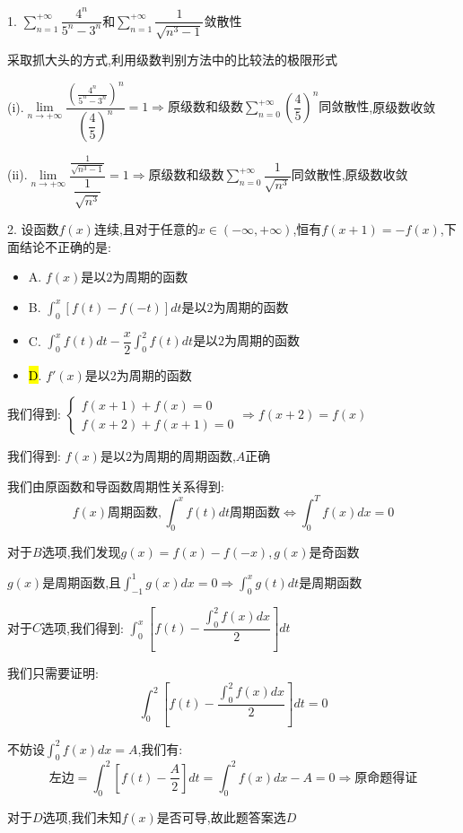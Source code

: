 1. $\sum\limits_{n=1}^{+\infty}\dfrac{4^n}{5^n-3^n}$和$\sum\limits_{n=1}^{+\infty}\dfrac{1}{\sqrt{n^3-1}}$敛散性
\begin{solution}
	
	采取抓大头的方式,利用级数判别方法中的比较法的极限形式
	
	(i).$\lim\limits_{n\rightarrow+\infty}\dfrac{(\frac{4^n}{5^n-3^n})^n}{(\dfrac{4}{5})^n}=1\Rightarrow \text{原级数和级数}\sum\limits_{n=0}^{+\infty}(\dfrac{4}{5})^n\text{同敛散性}$,原级数收敛
	
	(ii).$\lim\limits_{n\rightarrow+\infty}\dfrac{\frac{1}{\sqrt{n^3-1}}}{\dfrac{1}{\sqrt{n^3}}}=1\Rightarrow \text{原级数和级数}\sum\limits_{n=0}^{+\infty}\dfrac{1}{\sqrt{n^3}}\text{同敛散性}$,原级数收敛
\end{solution}


2. 设函数$f(x)$连续,且对于任意的$x\in(-\infty,+\infty)$,恒有$f(x+1)=-f(x)$,下面结论不正确的是: 
\begin{itemize}
	\item A. $f(x)\text{是以2为周期的函数}$ 
	\item B. $\int_{0}^{x}[f(t)-f(-t)]dt\text{是以2为周期的函数}$ 
	\item C. $\int_{0}^{x}f(t)dt-\dfrac{x}{2}\int_{0}^{2}f(t)dt\text{是以2为周期的函数}$ 
	\item \hl{D}. $f'(x)\text{是以2为周期的函数}$ 
\end{itemize}
\begin{solution}
	
	我们得到: $\left\lbrace 
	\begin{array}{l}
		f(x+1)+f(x)=0\\
		f(x+2)+f(x+1)=0
	\end{array}
	\right. \Rightarrow f(x+2)=f(x)$
	
	我们得到: $f(x)$是以$2$为周期的周期函数,$A$正确
	
	我们由原函数和导函数周期性关系得到: 
	$$f(x)\text{周期函数},\int_{0}^{x}f(t)dt\text{周期函数}\Leftrightarrow \int_{0}^{T}f(x)dx=0$$
	
	对于$B$选项,我们发现$g(x)=f(x)-f(-x),g(x)\text{是奇函数}$
	
	$g(x)\text{是周期函数}$,且$\int_{-1}^{1}g(x)dx=0\Rightarrow \int_{0}^{x}g(t)dt\text{是周期函数}$
	
	对于$C$选项,我们得到: $\int_{0}^{x}[f(t)-\dfrac{\int_{0}^{2}f(x)dx}{2}]dt$
	
	我们只需要证明: 
	$$\int_{0}^{2}[f(t)-\frac{\int_{0}^{2}f(x)dx}{2}]dt=0$$
	
	不妨设$\int_{0}^{2}f(x)dx=A$,我们有: 
	$$\text{左边}=\int_{0}^{2}[f(t)-\frac{A}{2}]dt=\int_{0}^{2}f(x)dx-A=0\Rightarrow \text{原命题得证}$$
	
	对于$D$选项,我们未知$f(x)$是否可导,故此题答案选$D$
\end{solution}

